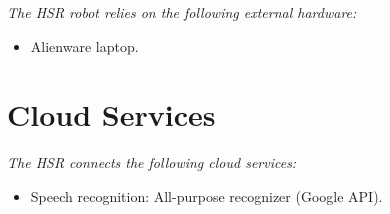 \textit{The HSR robot relies on the following external hardware:}

\begin{itemize}
	\item Alienware laptop.
\end{itemize}

\section*{Cloud Services}

\textit{The HSR connects the following cloud services:}
\begin{itemize}
	\item Speech recognition: All-purpose recognizer (Google API).
\end{itemize}